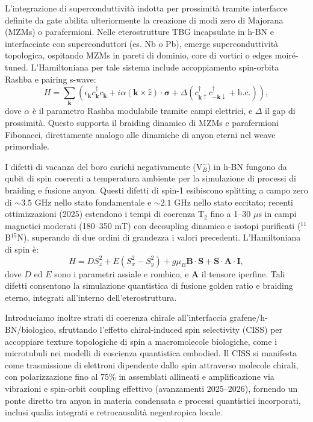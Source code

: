 \documentclass[11pt,a4paper]{article}
\theoremstyle{plain}
\theoremstyle{definition}
\begin{document}
L'integrazione di superconduttività indotta per prossimità tramite interfacce definite da gate abilita ulteriormente la creazione di modi zero di Majorana (MZMs) o parafermioni. Nelle eterostrutture TBG incapsulate in h-BN e interfacciate con superconduttori (es. Nb o Pb), emerge superconduttività topologica, ospitando MZMs in pareti di dominio, core di vortici o edges moiré-tuned. L'Hamiltoniana per tale sistema include accoppiamento spin-orbita Rashba e pairing s-wave:
\begin{equation}
H = \sum_{\mathbf{k}} \left( \epsilon_{\mathbf{k}} c^\dagger_{\mathbf{k}} c_{\mathbf{k}} + i \alpha (\mathbf{k} \times \hat{z}) \cdot \boldsymbol{\sigma} + \Delta (c^\dagger_{\mathbf{k}\uparrow} c^\dagger_{-\mathbf{k}\downarrow} + \mathrm{h.c.}) \right),
\end{equation}
dove $\alpha$ è il parametro Rashba modulabile tramite campi elettrici, e $\Delta$ il gap di prossimità. Questo supporta il braiding dinamico di MZMs e parafermioni Fibonacci, direttamente analogo alle dinamiche di anyon eterni nel weave primordiale.

I difetti di vacanza del boro carichi negativamente ($\mathrm{V}_B^-$) in h-BN fungono da qubit di spin coerenti a temperatura ambiente per la simulazione di processi di braiding e fusione anyon. Questi difetti di spin-1 esibiscono splitting a campo zero di $\sim 3.5$ GHz nello stato fondamentale e $\sim 2.1$ GHz nello stato eccitato; recenti ottimizzazioni (2025) estendono i tempi di coerenza T$_2$ fino a 1–30 $\mu$s in campi magnetici moderati (180–350 mT) con decoupling dinamico e isotopi purificati ($^{11}$B$^{15}$N), superando di due ordini di grandezza i valori precedenti. L'Hamiltoniana di spin è:
\begin{equation}
H = D S_z^2 + E (S_x^2 - S_y^2) + g \mu_B \mathbf{B} \cdot \mathbf{S} + \mathbf{S} \cdot \mathbf{A} \cdot \mathbf{I},
\end{equation}
dove $D$ ed $E$ sono i parametri assiale e rombico, e $\mathbf{A}$ il tensore iperfine. Tali difetti consentono la simulazione quantistica di fusione golden ratio e braiding eterno, integrati all'interno dell'eterostruttura.

Introduciamo inoltre strati di coerenza chirale all'interfaccia grafene/h-BN/biologico, sfruttando l'effetto chiral-induced spin selectivity (CISS) per accoppiare texture topologiche di spin a macromolecole biologiche, come i microtubuli nei modelli di coscienza quantistica embodied. Il CISS si manifesta come trasmissione di elettroni dipendente dallo spin attraverso molecole chirali, con polarizzazione fino al 75\% in assemblati allineati e amplificazione via vibrazioni e spin-orbit coupling effettivo (avanzamenti 2025–2026), fornendo un ponte diretto tra anyon in materia condensata e processi quantistici incorporati, inclusi qualia integrati e retrocausalità negentropica locale.
\end{document}
